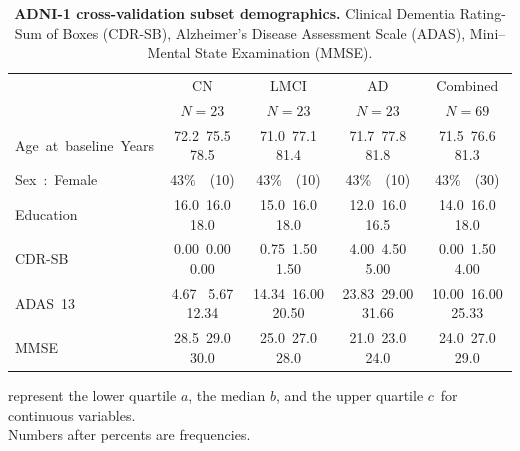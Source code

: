 \documentclass{article}\usepackage{graphicx, color}
\begin{document}
%
%
%
\begin{table}[!tbp]
\scriptsize
\caption{\textbf{ADNI-1 cross-validation subset demographics.} Clinical Dementia Rating-Sum of Boxes (CDR-SB), Alzheimer's Disease Assessment Scale (ADAS), Mini–Mental State Examination (MMSE).\label{tab:ADNI1-xvalidation-demographics}} 
\begin{center}
\begin{tabular}{lcccc}
\hline\hline
\multicolumn{1}{l}{}&\multicolumn{1}{c}{CN}&\multicolumn{1}{c}{LMCI}&\multicolumn{1}{c}{AD}&\multicolumn{1}{c}{Combined}\tabularnewline
&\multicolumn{1}{c}{{\scriptsize $N=23$}}&\multicolumn{1}{c}{{\scriptsize $N=23$}}&\multicolumn{1}{c}{{\scriptsize $N=23$}}&\multicolumn{1}{c}{{\scriptsize $N=69$}}\tabularnewline
\hline
Age~at~baseline~\hfill\tiny{Years}&{\scriptsize 72.2~}{75.5 }{\scriptsize 78.5} &{\scriptsize 71.0~}{77.1 }{\scriptsize 81.4} &{\scriptsize 71.7~}{77.8 }{\scriptsize 81.8} &{\scriptsize 71.5~}{76.6 }{\scriptsize 81.3} \tabularnewline
Sex~:~Female&43\%~{\scriptsize~(10)}&43\%~{\scriptsize~(10)}&43\%~{\scriptsize~(10)}&43\%~{\scriptsize~(30)}\tabularnewline
Education&{\scriptsize 16.0~}{16.0 }{\scriptsize 18.0} &{\scriptsize 15.0~}{16.0 }{\scriptsize 18.0} &{\scriptsize 12.0~}{16.0 }{\scriptsize 16.5} &{\scriptsize 14.0~}{16.0 }{\scriptsize 18.0} \tabularnewline
CDR-SB&{\scriptsize 0.00~}{0.00 }{\scriptsize 0.00} &{\scriptsize 0.75~}{1.50 }{\scriptsize 1.50} &{\scriptsize 4.00~}{4.50 }{\scriptsize 5.00} &{\scriptsize 0.00~}{1.50 }{\scriptsize 4.00} \tabularnewline
ADAS~13&{\scriptsize  4.67~}{ 5.67 }{\scriptsize 12.34} &{\scriptsize 14.34~}{16.00 }{\scriptsize 20.50} &{\scriptsize 23.83~}{29.00 }{\scriptsize 31.66} &{\scriptsize 10.00~}{16.00 }{\scriptsize 25.33} \tabularnewline
MMSE&{\scriptsize 28.5~}{29.0 }{\scriptsize 30.0} &{\scriptsize 25.0~}{27.0 }{\scriptsize 28.0} &{\scriptsize 21.0~}{23.0 }{\scriptsize 24.0} &{\scriptsize 24.0~}{27.0 }{\scriptsize 29.0} \tabularnewline
\hline
\end{tabular}
\end{center}
 represent the lower quartile $a$, the median $b$, and the upper quartile $c$\ for continuous variables.\\Numbers after percents are frequencies.\end{table}
\end{document}
